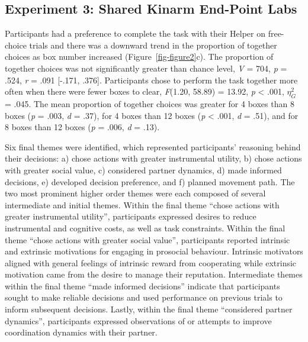\documentclass[
  11pt,
  letterpaper,
]{article}
\renewcommand{\emph}[1]{\textit{#1}}  %
\begin{document}
\subsection{Experiment 3: Shared Kinarm End-Point
Labs}\label{experiment-3-shared-kinarm-end-point-labs}

Participants had a preference to complete the task with their Helper on
free-choice trials and there was a downward trend in the proportion of
together choices as box number increased (Figure~\ref{fig-figure2}c).
The proportion of together choices was not significantly greater than
chance level, \emph{V} = 704, \emph{p} = .524, \emph{r} = .091 {[}-.171,
.376{]}. Participants chose to perform the task together more often when
there were fewer boxes to clear, \emph{F}(1.20, 58.89) = 13.92, \emph{p}
\textless{} .001, \(\eta_{G}^{2}\) = .045. The mean proportion of
together choices was greater for 4 boxes than 8 boxes (\emph{p} = .003,
\emph{d} = .37), for 4 boxes than 12 boxes (\emph{p} \textless{} .001,
\emph{d} = .51), and for 8 boxes than 12 boxes (\emph{p} = .006,
\emph{d} = .13).

Six final themes were identified, which represented participants'
reasoning behind their decisions: a) chose actions with greater
instrumental utility, b) chose actions with greater social value, c)
considered partner dynamics, d) made informed decisions, e) developed
decision preference, and f) planned movement path. The two most
prominent higher order themes were each composed of several intermediate
and initial themes. Within the final theme ``chose actions with greater
instrumental utility'', participants expressed desires to reduce
instrumental and cognitive costs, as well as task constraints. Within
the final theme ``chose actions with greater social value'',
participants reported intrinsic and extrinsic motivations for engaging
in prosocial behaviour. Intrinsic motivators aligned with general
feelings of intrinsic reward from cooperating while extrinsic motivation
came from the desire to manage their reputation. Intermediate themes
within the final theme ``made informed decisions'' indicate that
participants sought to make reliable decisions and used performance on
previous trials to inform subsequent decisions. Lastly, within the final
theme ``considered partner dynamics'', participants expressed
observations of or attempts to improve coordination dynamics with their
partner.
\end{document}
